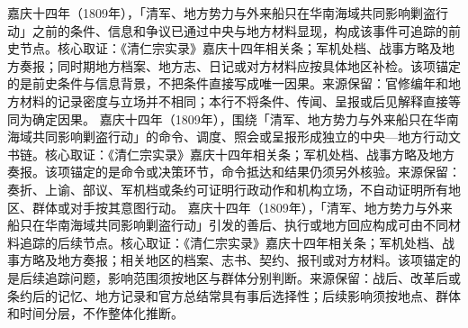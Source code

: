嘉庆十四年（1809年），「清军、地方势力与外来船只在华南海域共同影响剿盗行动」之前的条件、信息和争议已通过中央与地方材料显现，构成该事件可追踪的前史节点。核心取证：《清仁宗实录》嘉庆十四年相关条；军机处档、战事方略及地方奏报；同时期地方档案、地方志、日记或对方材料应按具体地区补检。该项锚定的是前史条件与信息背景，不把条件直接写成唯一因果。来源保留：官修编年和地方材料的记录密度与立场并不相同；本行不将条件、传闻、呈报或后见解释直接等同为确定因果。
嘉庆十四年（1809年），围绕「清军、地方势力与外来船只在华南海域共同影响剿盗行动」的命令、调度、照会或呈报形成独立的中央—地方行动文书链。核心取证：《清仁宗实录》嘉庆十四年相关条；军机处档、战事方略及地方奏报。该项锚定的是命令或决策环节，命令抵达和结果仍须另外核验。来源保留：奏折、上谕、部议、军机档或条约可证明行政动作和机构立场，不自动证明所有地区、群体或对手按其意图行动。
嘉庆十四年（1809年），「清军、地方势力与外来船只在华南海域共同影响剿盗行动」引发的善后、执行或地方回应构成可由不同材料追踪的后续节点。核心取证：《清仁宗实录》嘉庆十四年相关条；军机处档、战事方略及地方奏报；相关地区的档案、志书、契约、报刊或对方材料。该项锚定的是后续追踪问题，影响范围须按地区与群体分别判断。来源保留：战后、改革后或条约后的记忆、地方记录和官方总结常具有事后选择性；后续影响须按地点、群体和时间分层，不作整体化推断。
